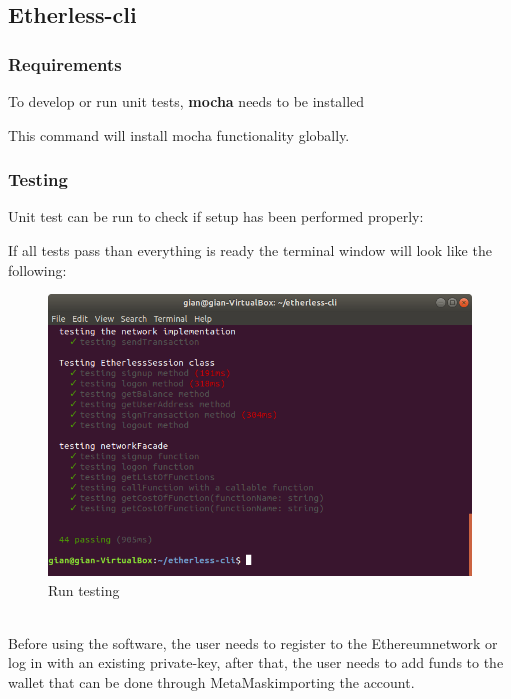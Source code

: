\subsection{Etherless-cli}
\subsubsection{Requirements}
To develop or run unit tests, \textbf{mocha} needs to be installed
\begin{center}
\end{center}
This command will install mocha functionality globally.

\subsubsection{Testing}
Unit test can be run to check if setup has been performed properly:
\begin{center}
\end{center}

\noindent If all tests pass than everything is ready the terminal window will look like the following:
\begin{figure}[h]
	\centering
	\includegraphics[width=\textwidth]{res/img/npmruntest.png}
	\caption{Run testing}
\end{figure}
\noindent \\Before using the software, the user needs to register to the Ethereum\glo network or log in with an existing private-key\glo, after that, the user needs to add funds to the wallet that can be done through MetaMask\glo importing the account.

